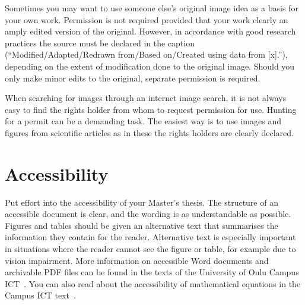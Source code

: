 Sometimes you may want to use someone else's original image idea as a
basis for your own work. Permission is not required provided that
your work clearly an amply edited version of the original. However,
in accordance with good research practices the source must be
declared in the caption (“Modified/Adapted/Redrawn from/Based
on/Created using data from [x].”), depending on the extent of
modification done to the original image. Should you only make minor
edits to the original, separate permission is required.

When searching for images through an internet image search, it is not
always easy to find the rights holder from whom to request permission
for use. Hunting for a permit can be a demanding task. The easiest
way is to use images and figures from scientific articles as in these
the rights holders are clearly declared.

\section{Accessibility}
\label{accessibility}
Put effort into the accessibility of your Master’s thesis. The
structure of an accessible document is clear, and the wording is as
understandable as possible. Figures and tables should be given an
alternative text that summarises the information they contain for the
reader. Alternative text is especially important in situations where
the reader cannot see the figure or table, for example due to vision
impairment.  More information on accessible Word documents and
archivable PDF files can be found in the texts of the University of
Oulu Campus ICT~\cite{ictaccessibleword,ictwordpdfa}. You can also
read about the accessibility of mathematical equations in the Campus
ICT text~\cite{ictaccessiblemath}.
